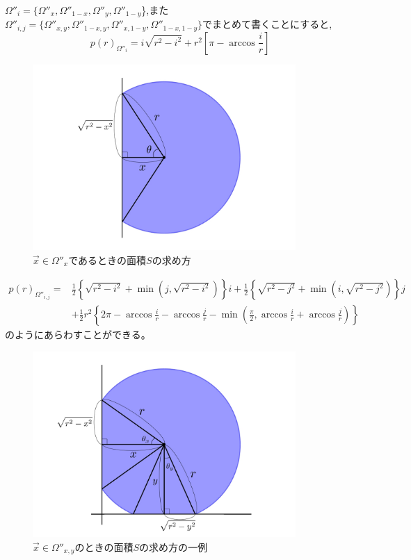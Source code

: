 $\Omega''_{i} = \{\Omega''_{x}, \Omega''_{1-x}, \Omega''_{y}, \Omega''_{1-y}$\},また$\Omega''_{i,j} = \{\Omega''_{x,y}, \Omega''_{1-x,y}, \Omega''_{x,1-y}, \Omega''_{1-x,1-y}\}$でまとめて書くことにすると,
\[p(r)_{\Omega''_{i}} = i \sqrt{r^{2}-i^{2}} + r^{2} \left[ \pi -\arccos \frac{i}{r} \right]\]
\begin{figure}[H]
    \begin{center}
        \includegraphics[width=10cm]{../img/omega_x.jpg}
        \caption{$\vec{x} \in \Omega''_{x}$であるときの面積$S$の求め方}
        \label{fig:f21}
    \end{center}
\end{figure}
\begin{align}p(r)_{\Omega''_{i,j}} = &\frac{1}{2}\left\{ \sqrt{r^{2}-i^{2}} + \min \left(j, \sqrt{r^{2}-i^{2}}\right) \right\}i + \frac{1}{2}\left\{ \sqrt{r^{2}-j^{2}} + \min \left( i, \sqrt{r^{2}-j^{2}}\right) \right\}j \nonumber \\
&+ \frac{1}{2}r^{2} \left\{ 2\pi -\arccos \frac{i}{r}-\arccos \frac{j}{r}-\min \left( \frac{\pi}{2}, \arccos \frac{i}{r} +\arccos \frac{j}{r} \right) \right\}
\end{align}
のようにあらわすことができる。
\begin{figure}[H]
    \begin{center}
        \includegraphics[width=10cm]{../img/omega_xy.jpg}
        \caption{$\vec{x} \in \Omega''_{x,y}$のときの面積$S$の求め方の一例}
        \label{fig:f22}
    \end{center}
\end{figure}

